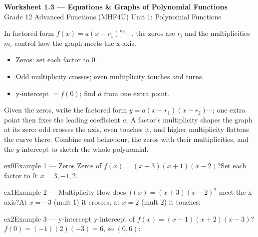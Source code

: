 \documentclass[11pt]{article}
\begin{document}
\begin{center}
{\LARGE\bfseries\color{titleblue}Worksheet 1.3 --- Equations \& Graphs of Polynomial Functions}\\[2pt]
{\small Grade 12 Advanced Functions (MHF4U) \textperiodcentered{} Unit 1: Polynomial Functions}
\end{center}

\begin{ideabox}
In factored form $f(x)=a(x-r_1)^{m_1}\cdots$, the zeros are $r_i$ and the multiplicities $m_i$ control how the graph meets the x-axis.
\begin{itemize}[leftmargin=*,itemsep=2pt]
  \item Zeros: set each factor to $0$.
  \item Odd multiplicity crosses; even multiplicity touches and turns.
  \item y-intercept $=f(0)$; find $a$ from one extra point.
\end{itemize}
\end{ideabox}

\begin{learnbox}
Given the zeros, write the factored form $y=a(x-r_1)(x-r_2)\cdots$; one extra point then fixes the leading coefficient $a$.
A factor's multiplicity shapes the graph at its zero: odd crosses the axis, even touches it, and higher multiplicity flattens the curve there.
Combine end behaviour, the zeros with their multiplicities, and the $y$-intercept to sketch the whole polynomial.
\end{learnbox}


\begin{example}{ex0}{Example 1 --- Zeros}
Zeros of $f(x)=(x-3)(x+1)(x-2)$?\soln Set each factor to 0: $x=3,-1,2$.
\end{example}

\begin{example}{ex1}{Example 2 --- Multiplicity}
How does $f(x)=(x+3)(x-2)^2$ meet the x-axis?\soln At $x=-3$ (mult 1) it crosses; at $x=2$ (mult 2) it touches:
\end{example}

\begin{example}{ex2}{Example 3 --- y-intercept}
y-intercept of $f(x)=(x-1)(x+2)(x-3)$?\soln $f(0)=(-1)(2)(-3)=6$, so $(0,6)$:
\end{example}
\end{document}
